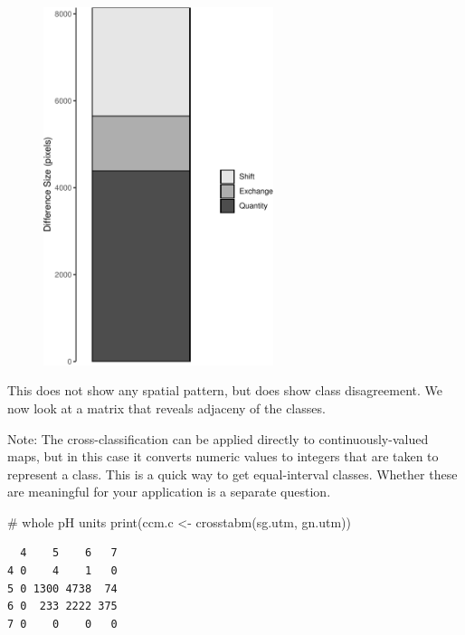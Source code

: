 \documentclass[
  letterpaper,
  DIV=11,
  numbers=noendperiod]{scrartcl}
\newenvironment{Shaded}{\begin{snugshade}}{\end{snugshade}}
\newcommand{\CommentTok}[1]{\textcolor[rgb]{0.37,0.37,0.37}{#1}}
\newcommand{\FunctionTok}[1]{\textcolor[rgb]{0.28,0.35,0.67}{#1}}
\newcommand{\NormalTok}[1]{\textcolor[rgb]{0.00,0.23,0.31}{#1}}
\newcommand{\OtherTok}[1]{\textcolor[rgb]{0.00,0.23,0.31}{#1}}
\begin{document}
\begin{figure}[H]

{\centering \includegraphics[width=0.6\textwidth,height=\textheight]{PatternAnalysisWorkshopTutorial_files/figure-pdf/components-plot-1.pdf}

}

\end{figure}

This does not show any spatial pattern, but does show class
disagreement. We now look at a matrix that reveals adjaceny of the
classes.

Note: The cross-classification can be applied directly to
continuously-valued maps, but in this case it converts numeric values to
integers that are taken to represent a class. This is a quick way to get
equal-interval classes. Whether these are meaningful for your
application is a separate question.

\begin{Shaded}
\begin{Highlighting}[]
\CommentTok{\# whole pH units}
\FunctionTok{print}\NormalTok{(ccm.c }\OtherTok{\textless{}{-}} \FunctionTok{crosstabm}\NormalTok{(sg.utm, gn.utm))}
\end{Highlighting}
\end{Shaded}

\begin{verbatim}
  4    5    6   7
4 0    4    1   0
5 0 1300 4738  74
6 0  233 2222 375
7 0    0    0   0
\end{verbatim}
\end{document}
